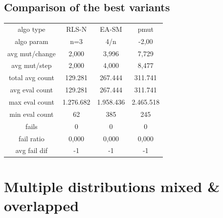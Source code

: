 \subsection{Comparison of the best variants}
\begin{tabular}[h]{cccc}
algo type&               RLS-N&        EA-SM&         pmut\\
algo param&                n=3&          4/n&        -2,00\\
avg mut/change&          2,000&        3,996&        7,729\\
avg mut/step&            2,000&        4,000&        8,477\\
\hline
total avg count&       129.281&      267.444&      311.741\\
avg eval count&        129.281&      267.444&      311.741\\
max eval count&      1.276.682&    1.958.436&    2.465.518\\
min eval count&             62&          385&          245\\
\hline
fails&                       0&            0&            0\\
fail ratio&              0,000&        0,000&        0,000\\
avg fail dif&               -1&           -1&           -1\\
\end{tabular}
\section{Multiple distributions mixed \& overlapped}
